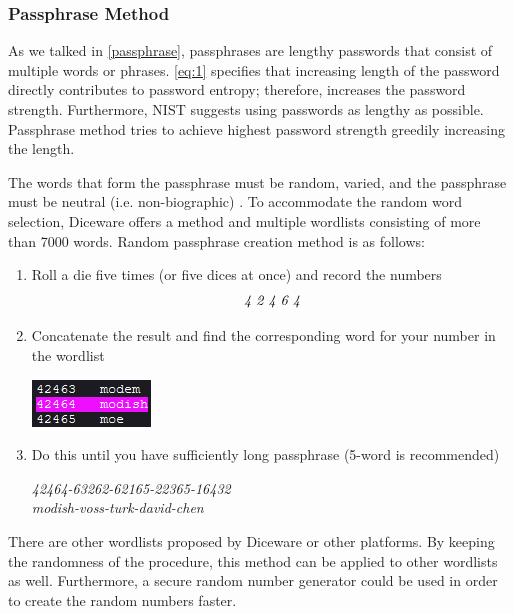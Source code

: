 \documentclass[acmsmall,nonacm]{acmart}
\begin{document}
\subsubsection{Passphrase Method} \label{creation-passphrase}

As we talked in \autoref{passphrase}, passphrases are lengthy passwords that consist of multiple words or phrases. \autoref{eq:1} specifies that increasing length of the password directly contributes to password entropy; therefore, increases the password strength. Furthermore, NIST suggests using passwords as lengthy as possible. Passphrase method tries to achieve highest password strength greedily increasing the length.

The words that form the passphrase must be random, varied,  and the passphrase must be neutral (i.e. non-biographic) \cite{nist_2020,Kavrestad_2019}. To accommodate the random word selection, Diceware \cite{reinhold_2021} offers a method and multiple wordlists consisting of more than 7000 words. Random passphrase creation method is as follows:

\renewcommand{\labelenumi}{\arabic{enumi}.}
\begin{enumerate}
    \item Roll a die five times (or five dices at once) and record the numbers 
    \begin{align*}
        \emph{4  2  4  6  4}
    \end{align*}
    \item Concatenate the result and find the corresponding word for your number in the wordlist 
    \begin{center}
        \includegraphics{samples/modish1}
    \end{center}
    
    \item Do this until you have sufficiently long passphrase (5-word is recommended)
    \begin{center}
        \emph{42464-63262-62165-22365-16432}\\
        \emph{modish-voss-turk-david-chen}
    \end{center}
\end{enumerate}


There are other wordlists proposed by Diceware or other platforms. By keeping the randomness of the procedure, this method can be applied to other wordlists as well. Furthermore, a secure random number generator could be used in order to create the random numbers faster.
\end{document}
